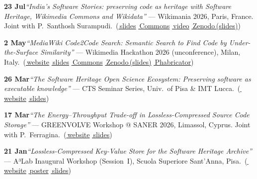 \documentclass[10pt,a4paper,ragged2e,academicons]{altacv}
\newif\ifshortcv
\newcommand{\Lzenodo}[2]{\href{#2}{\faArchive\,Zenodo\,(#1)}}
\newcommand{\Lsep}{\;\textcolor{body!40}{\textbullet}\;}
\begin{document}
\begin{paracol}{1}
{\begin{talklist}
  \item \textbf{23 Jul}\enspace \textit{``India's Software Stories: preserving code as heritage with Software Heritage, Wikimedia Commons and Wikidata''} --- Wikimania 2026, Paris, France. Joint with P.~Santhosh Surampudi.\ {\footnotesize(\href{https://www.francescotosoni.it/static/slides_20260723.pdf}{\faFilePowerpoint\,slides} \Lsep \href{https://commons.wikimedia.org/wiki/File:Wikimania_2026._India%27s_Software_Stories_(Super_nabla,_Pavan_Santhosh).pdf}{\faImages\,Commons} \Lsep \href{https://www.youtube.com/live/saeV6bZ7cIk?t=25105}{\faYoutube\,video} \Lsep \Lzenodo{slides}{https://doi.org/10.5281/zenodo.23105777})}

  \ifshortcv\else
  \item \textbf{2 May}\enspace \textit{``MediaWiki Code2Code Search: Semantic Search to Find Code by Under-the-Surface Similarity''} --- Wikimedia Hackathon 2026 (unconference), Milan, Italy.\ {\footnotesize(\href{https://www.mediawiki.org/wiki/Wikimedia_Hackathon_2026/Program}{\faGlobe\,website} \Lsep \href{https://www.francescotosoni.it/static/slides_20260502.pdf}{\faFilePowerpoint\,slides} \Lsep \href{https://commons.wikimedia.org/wiki/File:Mediawiki-code2codesearch-wmhackathon2026-slides.pdf}{\faImages\,Commons} \Lsep \Lzenodo{slides}{https://doi.org/10.5281/zenodo.23105763} \Lsep \href{https://phabricator.wikimedia.org/T425057}{\faTasks\,Phabricator})}
  \fi

  \item \textbf{26 Mar}\enspace \textit{``The Software Heritage Open Science Ecosystem: Preserving software as executable knowledge''} --- CTS Seminar Series, Univ.~of Pisa \& IMT Lucca.\tinv\ {\footnotesize(\href{https://pages.di.unipi.it/bodei/CTS2026}{\faGlobe\,website} \Lsep \href{https://www.francescotosoni.it/static/slides_20260326.pdf}{\faFilePowerpoint\,slides})}

  \item \textbf{17 Mar}\enspace \textit{``The Energy--Throughput Trade-off in Lossless-Compressed Source Code Storage''} --- GREENVOLVE Workshop @ SANER 2026, Limassol, Cyprus. Joint with P.~Ferragina.\ {\footnotesize(\href{https://conf.researchr.org/details/saner-2026/saner-2026-workshops-tutorials-track/10/The-Energy-Throughput-Trade-off-in-Lossless-Compressed-Source-Code-Storage}{\faGlobe\,website} \Lsep \href{https://www.francescotosoni.it/static/slides_20260317.pdf}{\faFilePowerpoint\,slides})}

  \ifshortcv\else
  \item \textbf{21 Jan}\enspace \textit{``Lossless-Compressed Key-Value Store for the Software Heritage Archive''} --- A³Lab Inaugural Workshop (Session~I), Scuola Superiore Sant'Anna, Pisa.\ {\footnotesize(\href{https://www.santannapisa.it/it/evento/a3lab-inaugural-workshop-algorithms-ai-society}{\faGlobe\,website} \Lsep \href{https://www.santannapisa.it/sites/default/files/2026-01/21%20Jan%202026_02.pdf}{\faImage\,poster} \Lsep \href{https://www.francescotosoni.it/static/slides_20260121.pdf}{\faFilePowerpoint\,slides})}
  \fi
\end{talklist}

}
\end{paracol}
\end{document}
